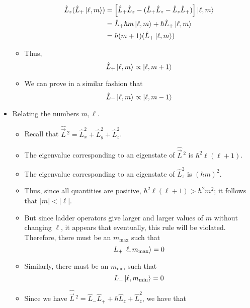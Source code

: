 \documentclass[../notes.tex]{subfiles}
\begin{document}
\begin{itemize}
\begin{itemize}
\begin{align*}
            \hat{L}_z(\hat{L}_+\ket{\ell,m}) &= \left[ \hat{L}_+\hat{L}_z-(\hat{L}_+\hat{L}_z-\hat{L}_z\hat{L}_+) \right]\ket{\ell,m}\\
            &= \hat{L}_+\hbar m\ket{\ell,m}+\hbar\hat{L}_+\ket{\ell,m}\\
            &= \hbar(m+1)(\hat{L}_+\ket{\ell,m})
        \end{align*}
        \item Thus,
        \begin{equation*}
            \hat{L}_+\ket{\ell,m} \propto \ket{\ell,m+1}
        \end{equation*}
        \item We can prove in a similar fashion that
        \begin{equation*}
            \hat{L}_-\ket{\ell,m} \propto \ket{\ell,m-1}
        \end{equation*}
    \end{itemize}
    \item Relating the numbers $m,\ell$.
    \begin{itemize}
        \item Recall that $\hat{\vec{L}}{\,}^2=\hat{L}_x^2+\hat{L}_y^2+\hat{L}_z^2$.
        \item The eigenvalue corresponding to an eigenstate of $\hat{\vec{L}}{\,}^2$ is $\hbar^2\ell(\ell+1)$.
        \item The eigenvalue corresponding to an eigenstate of $\hat{L}_z^2$ is $(\hbar m)^2$.
        \item Thus, since all quantities are positive, $\hbar^2\ell(\ell+1)>\hbar^2m^2$; it follows that $|m|<|\ell|$.
        \item But since ladder operators give larger and larger values of $m$ without changing $\ell$, it appears that eventually, this rule will be violated. Therefore, there must be an $m_\text{max}$ such that
        \begin{equation*}
            L_+\ket{\ell,m_\text{max}} = 0
        \end{equation*}
        \item Similarly, there must be an $m_\text{min}$ such that
        \begin{equation*}
            L_-\ket{\ell,m_\text{min}} = 0
        \end{equation*}
        \item Since we have $\hat{\vec{L}}{\,}^2=\hat{L}_-\hat{L}_++\hbar\hat{L}_z+\hat{L}_z^2$, we have that
        \begin{equation*}

\end{equation*}
\end{itemize}
\end{itemize}
\end{document}
